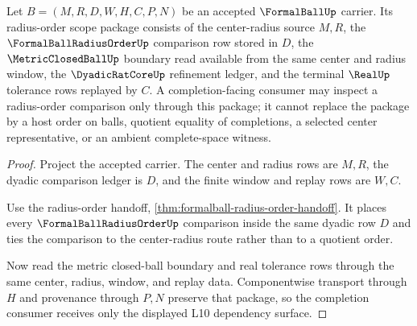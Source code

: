 \begin{theorem}
\label{thm:formalball-radius-order-scope-package}
Let $B=(M,R,D,W,H,C,P,N)$ be an accepted $\FormalBallUp$ carrier. Its radius-order scope package consists of the center-radius source $M,R$, the $\FormalBallRadiusOrderUp$ comparison row stored in $D$, the $\MetricClosedBallUp$ boundary read available from the same center and radius window, the $\DyadicRatCoreUp$ refinement ledger, and the terminal $\RealUp$ tolerance rows replayed by $C$. A completion-facing consumer may inspect a radius-order comparison only through this package; it cannot replace the package by a host order on balls, quotient equality of completions, a selected center representative, or an ambient complete-space witness.
\end{theorem}
\begin{proof}
Project the accepted carrier. The center and radius rows are $M,R$, the dyadic comparison ledger is $D$, and the finite window and replay rows are $W,C$.

Use the radius-order handoff, \autoref{thm:formalball-radius-order-handoff}. It places every $\FormalBallRadiusOrderUp$ comparison inside the same dyadic row $D$ and ties the comparison to the center-radius route rather than to a quotient order.

Now read the metric closed-ball boundary and real tolerance rows through the same center, radius, window, and replay data. Componentwise transport through $H$ and provenance through $P,N$ preserve that package, so the completion consumer receives only the displayed L10 dependency surface.
\end{proof}

